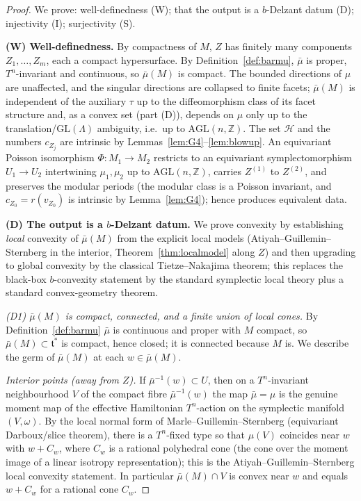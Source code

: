 \documentclass{amsart}
\theoremstyle{definition}
\begin{document}
\begin{proof}
We prove: well-definedness (W); that the output is a $b$-Delzant datum (D);
injectivity (I); surjectivity (S).

\medskip
\noindent\textbf{(W) Well-definedness.}
By compactness of $M$, $Z$ has finitely many components $Z_1,\dots,Z_m$, each a
compact hypersurface. By Definition~\ref{def:barmu}, $\bar\mu$ is proper,
$T^n$-invariant and continuous, so $\bar\mu(M)$ is compact. The bounded
directions of $\mu$ are unaffected, and the singular directions are collapsed to
finite facets; $\bar\mu(M)$ is independent of the auxiliary $\tau$ up to the
diffeomorphism class of its facet structure and, as a convex set (part (D)),
depends on $\mu$ only up to the translation/$\mathrm{GL}(\Lambda)$ ambiguity,
i.e.\ up to $\mathrm{AGL}(n,\mathbb Z)$. The set $\mathcal H$ and the numbers
$c_{Z_j}$ are intrinsic by Lemmas~\ref{lem:G4}--\ref{lem:blowup}. An equivariant
Poisson isomorphism $\Phi\colon M_1\to M_2$ restricts to an equivariant
symplectomorphism $U_1\to U_2$ intertwining $\mu_1,\mu_2$ up to
$\mathrm{AGL}(n,\mathbb Z)$, carries $Z^{(1)}$ to $Z^{(2)}$, and preserves the
modular periods (the modular class is a Poisson invariant, and $c_{Z_0}=r(v_{Z_0})$
is intrinsic by Lemma~\ref{lem:G4}); hence produces equivalent data.

\medskip
\noindent\textbf{(D) The output is a $b$-Delzant datum.}
We prove convexity by establishing \emph{local} convexity of $\bar\mu(M)$ from
the explicit local models (Atiyah--Guillemin--Sternberg in the interior,
Theorem~\ref{thm:localmodel} along $Z$) and then upgrading to global convexity
by the classical Tietze--Nakajima theorem; this replaces the black-box
$b$-convexity statement by the standard symplectic local theory plus a standard
convex-geometry theorem.

\emph{(D1) $\bar\mu(M)$ is compact, connected, and a finite union of local
cones.} By Definition~\ref{def:barmu} $\bar\mu$ is continuous and proper with
$M$ compact, so $\bar\mu(M)\subset\mathfrak t^*$ is compact, hence closed; it is
connected because $M$ is. We describe the germ of $\bar\mu(M)$ at each
$w\in\bar\mu(M)$.

\emph{Interior points (away from $Z$).} If $\bar\mu^{-1}(w)\subset U$, then on a
$T^n$-invariant neighbourhood $V$ of the compact fibre $\bar\mu^{-1}(w)$ the map
$\bar\mu=\mu$ is the genuine moment map of the effective Hamiltonian
$T^n$-action on the symplectic manifold $(V,\omega)$. By the local normal form
of Marle--Guillemin--Sternberg (equivariant Darboux/slice theorem), there is a
$T^n$-fixed type so that $\mu(V)$ coincides near $w$ with $w+C_w$, where $C_w$
is a rational polyhedral cone (the cone over the moment image of a linear
isotropy representation); this is the Atiyah--Guillemin--Sternberg local
convexity statement. In particular $\bar\mu(M)\cap V$ is convex near $w$ and
equals $w+C_w$ for a rational cone $C_w$.


\end{proof}
\end{document}
